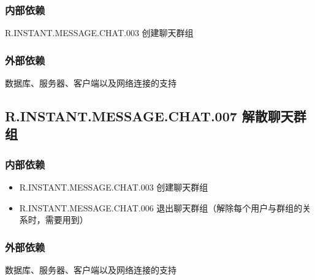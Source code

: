 \subsubsection{内部依赖}
    R.INSTANT.MESSAGE.CHAT.003 创建聊天群组
\subsubsection{外部依赖}
    数据库、服务器、客户端以及网络连接的支持

\subsection{R.INSTANT.MESSAGE.CHAT.007 解散聊天群组}
\subsubsection{内部依赖}
\begin{itemize}
    \item R.INSTANT.MESSAGE.CHAT.003 创建聊天群组
    \item R.INSTANT.MESSAGE.CHAT.006 退出聊天群组（解除每个用户与群组的关系时，需要用到）
\end{itemize}
\subsubsection{外部依赖}
    数据库、服务器、客户端以及网络连接的支持
